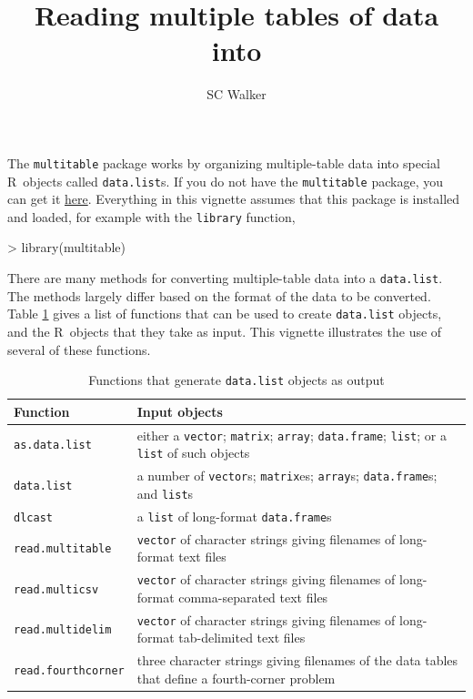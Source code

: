 \documentclass{article}
\title{Reading multiple tables of data into \R}
\author{SC Walker}
\newcommand{\R}{{\sf R}}
\newcommand{\code}[1]{\texttt{#1}}
\numberwithin{exercise}{section}
\begin{document}
\maketitle

The \code{multitable} package works by organizing multiple-table data into special \R\ objects called \code{data.list}s.  If you do not have the \code{multitable} package, you can get it \href{https://r-forge.r-project.org/R/?group_id=1171}{here}.  Everything in this vignette assumes that this package is installed and loaded, for example with the \code{library} function,
\begin{Schunk}
\begin{Sinput}
> library(multitable)
\end{Sinput}
\end{Schunk}

There are many methods for converting multiple-table data into a \code{data.list}.  The methods largely differ based on the format of the data to be converted.  Table \ref{tab:functions} gives a list of functions that can be used to create \code{data.list} objects, and the \R\ objects that they take as input.  This vignette illustrates the use of several of these functions.

\begin{table}[h]
\caption{Functions that generate \code{data.list} objects as output}
\begin{center}
\begin{tabular}{p{3cm}p{8cm}}
\hline
Function & Input objects \\
\hline
\code{as.data.list} & either a \code{vector}; \code{matrix}; \code{array}; \code{data.frame}; \code{list}; or a \code{list} of such objects \\
\code{data.list} & a number of \code{vector}s; \code{matrix}es; \code{array}s; \code{data.frame}s; and \code{list}s \\
\code{dlcast} & a \code{list} of long-format \code{data.frame}s \\
\code{read.multitable} & \code{vector} of character strings giving filenames of long-format text files \\
\code{read.multicsv} & \code{vector} of character strings giving filenames of long-format comma-separated text files \\
\code{read.multidelim} & \code{vector} of character strings giving filenames of long-format tab-delimited text files \\
\code{read.fourthcorner} & three character strings giving filenames of the data tables that define a fourth-corner problem \\
\hline
\end{tabular}
\end{center}
\label{tab:functions}
\end{table}
\end{document}
